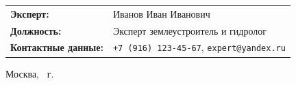 \begin{titlepage}
\begin{center}
        \vspace{2cm} %
        
	{\fontsize{12}{14}\selectfont
	\begin{tabularx}{0.9\textwidth}{@{}>{\bfseries}lX@{}}
    	Эксперт: & Иванов Иван Иванович \\[5pt]
    	Должность: & Эксперт землеустроитель и гидролог \\[5pt]
    	Контактные данные: & \texttt{+7 (916) 123-45-67}, \texttt{expert@yandex.ru} \\[5pt]            
	\end{tabularx}
	}
        
        \vfill
        
        {\fontsize{12}{14}\selectfont Москва, \the\year\ г.}
    \end{center}
\end{titlepage}